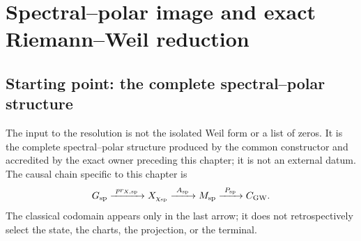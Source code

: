 \chapter{Spectral--polar image and exact Riemann--Weil reduction}

\section{Starting point: the complete spectral--polar structure}

The input to the resolution is not the isolated Weil form or a list of
zeros. It is the complete spectral--polar structure produced by the common
constructor and accredited by the exact owner preceding this chapter; it is not
an external datum. The causal chain specific to this chapter is
\begin{equation}\label{eq:pdf2-rh-cadena-procedencia}
 \mathfrak G_{\rm sp}
 \xrightarrow{\ \operatorname{pr}_{X,{\rm sp}}\ }X_{\chi_{\rm sp}}
 \xrightarrow{\ \mathcal A_{\rm sp}\ }\mathfrak M_{\rm sp}
 \xrightarrow{\ \mathcal P_{\rm sp}\ }\mathcal C_{\rm GW}.
\end{equation}
The classical codomain appears only in the last arrow; it does not
retrospectively select the state, the charts, the projection, or the terminal.


